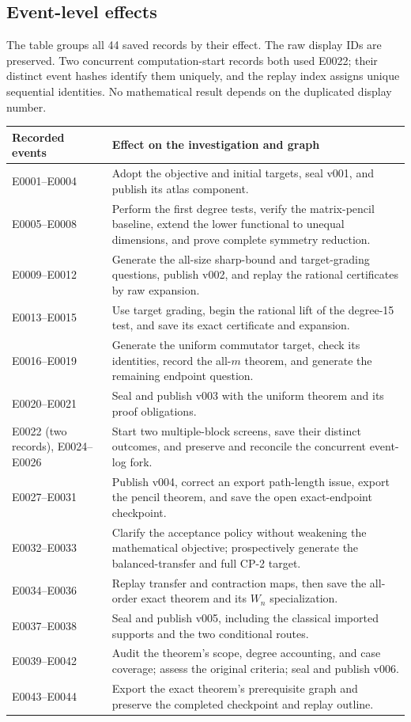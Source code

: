 \subsection{Event-level effects}\label{app:event-effects}

The table groups all 44 saved records by their effect. The raw display IDs are preserved. Two concurrent computation-start records both used E0022; their distinct event hashes identify them uniquely, and the replay index assigns unique sequential identities. No mathematical result depends on the duplicated display number.

\small
\begin{longtable}{@{}p{2.7cm}p{11.3cm}@{}}
\toprule
Recorded events & Effect on the investigation and graph \\
\midrule
\endhead
E0001--E0004 & Adopt the objective and initial targets, seal v001, and publish its atlas component. \\
E0005--E0008 & Perform the first degree tests, verify the matrix-pencil baseline, extend the lower functional to unequal dimensions, and prove complete symmetry reduction. \\
E0009--E0012 & Generate the all-size sharp-bound and target-grading questions, publish v002, and replay the rational certificates by raw expansion. \\
E0013--E0015 & Use target grading, begin the rational lift of the degree-15 test, and save its exact certificate and expansion. \\
E0016--E0019 & Generate the uniform commutator target, check its identities, record the all-$m$ theorem, and generate the remaining endpoint question. \\
E0020--E0021 & Seal and publish v003 with the uniform theorem and its proof obligations. \\
E0022 (two records), E0024--E0026 & Start two multiple-block screens, save their distinct outcomes, and preserve and reconcile the concurrent event-log fork. \\
E0027--E0031 & Publish v004, correct an export path-length issue, export the pencil theorem, and save the open exact-endpoint checkpoint. \\
E0032--E0033 & Clarify the acceptance policy without weakening the mathematical objective; prospectively generate the balanced-transfer and full CP-2 target. \\
E0034--E0036 & Replay transfer and contraction maps, then save the all-order exact theorem and its $W_n$ specialization. \\
E0037--E0038 & Seal and publish v005, including the classical imported supports and the two conditional routes. \\
E0039--E0042 & Audit the theorem's scope, degree accounting, and case coverage; assess the original criteria; seal and publish v006. \\
E0043--E0044 & Export the exact theorem's prerequisite graph and preserve the completed checkpoint and replay outline. \\
\bottomrule
\end{longtable}
\normalsize

